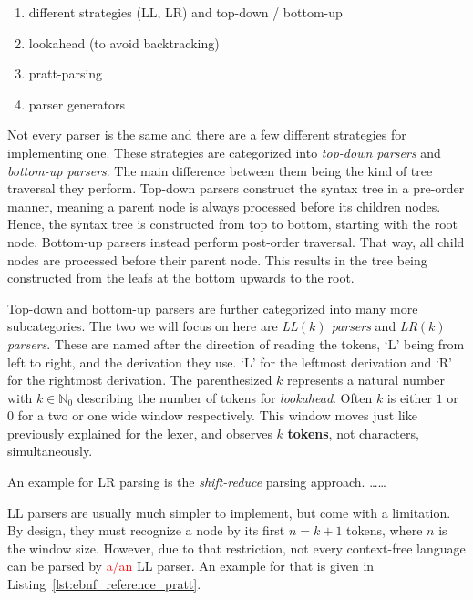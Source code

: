\begin{enumerate}
    \item different strategies (LL, LR) and top-down / bottom-up
    \item lookahead (to avoid backtracking)
    \item pratt-parsing
    \item parser generators
\end{enumerate}

Not every parser is the same and there are a few different strategies for implementing one.
These strategies are categorized into \emph{top-down parsers} and \emph{bottom-up parsers}.
The main difference between them being the kind of tree traversal they perform.
Top-down parsers construct the syntax tree in a pre-order manner, meaning a parent node is always processed before its children nodes.
Hence, the syntax tree is constructed from top to bottom, starting with the root node.
Bottom-up parsers instead perform post-order traversal.
That way, all child nodes are processed before their parent node.
This results in the tree being constructed from the leafs at the bottom upwards to the root.

Top-down and bottom-up parsers are further categorized into many more subcategories.
The two we will focus on here are \emph{LL$(k)$ parsers} and \emph{LR$(k)$ parsers}.
These are named after the direction of reading the tokens, `L' being from left to right, and the derivation they use.
`L' for the leftmost derivation and `R' for the rightmost derivation.
The parenthesized $k$ represents a natural number with $k\in\mathbb{N}_0$ describing the number of tokens for \emph{lookahead}.
Often $k$ is either $1$ or $0$ for a two or one wide window respectively.
This window moves just like previously explained for the lexer, and observes $k$ \textbf{tokens}, not characters, simultaneously.

An example for LR parsing is the \emph{shift-reduce} parsing approach.
\ldots{}\ldots

LL parsers are usually much simpler to implement, but come with a limitation.
By design, they must recognize a node by its first $n=k+1$ tokens, where $n$ is the window size.
However, due to that restriction, not every context-free language can be parsed by \textcolor{red}{a/an} LL parser.
An example for that is given in Listing~\ref{lst:ebnf_reference_pratt}.

